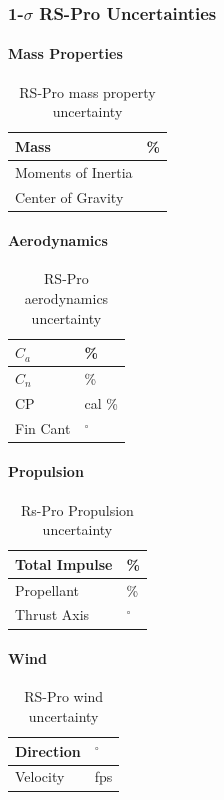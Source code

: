 \documentclass[12pt]{article}
\newcommand{\ph}{\framebox[48pt]{\rule{0pt}{12pt}}}
\begin{document}
\subsubsection{1-$\sigma$ RS-Pro Uncertainties}
\paragraph{Mass Properties}
\begin{table}[H]
    \centering
    \caption{RS-Pro mass property uncertainty}
    \begin{tabular}{|l|l|}
        \hline
        Mass & \ph\% \\ \hline
        Moments of Inertia & \ph \\ \hline
        Center of Gravity & \ph \\ \hline
    \end{tabular}
\end{table}
\paragraph{Aerodynamics}
\begin{table}[H]
    \centering
    \caption{RS-Pro aerodynamics uncertainty}
    \begin{tabular}{|l|l|}
        \hline
        $C_a$ & \ph \% \\ \hline
        $C_n$ & \ph \% \\ \hline
        CP & \ph cal \% \\ \hline
        Fin Cant & \ph$^\circ$ \\ \hline
    \end{tabular}
\end{table}
\paragraph{Propulsion}
\begin{table}[H]
    \centering
    \caption{Rs-Pro Propulsion uncertainty}
    \begin{tabular}{|l|l|}
        \hline
        Total Impulse & \ph \% \\ \hline
        Propellant & \ph \% \\ \hline
        Thrust Axis & \ph $^\circ$ \\ \hline
    \end{tabular}
\end{table}
\paragraph{Wind}
\begin{table}[H]
    \centering
    \caption{RS-Pro wind uncertainty}
    \begin{tabular}{|l|l|}
        \hline
        Direction & \ph $^\circ$ \\ \hline
        Velocity & \ph fps \\ \hline
    \end{tabular}
\end{table}
\end{document}
